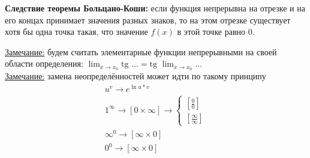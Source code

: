 \documentclass[12pt]{article}
\begin{document}
    \textbf{Следствие теоремы Больцано-Коши:} если функция непрерывна на отрезке и на его концах принимает значения разных знаков, то на этом отрезке существует хотя бы одна точка такая, что значение $f(x)$ в этой точке равно 0.\par\noindent
    \underline{Замечание:} будем считать элементарные функции непрерывными на своей области определения: $\lim_{x\to x_0}\text{tg }\dots = \text{tg } \lim_{x\to x_0}\dots$\\
    \underline{Замечание:} замена неопределённостей может идти по такому принципу
    \begin{gather*}
        u^v \to e^{\ln u * v}\\
        1^\infty \to \left[0 \times \infty\right] \to \begin{cases}
            \left[\frac{0}{0}\right]\\
            \left[\frac{\infty}{\infty}\right]
        \end{cases}\\
        \infty^0 \to \left[\infty \times 0\right]\\
        0^0 \to \left[\infty \times 0\right]
    \end{gather*}
\end{document}
